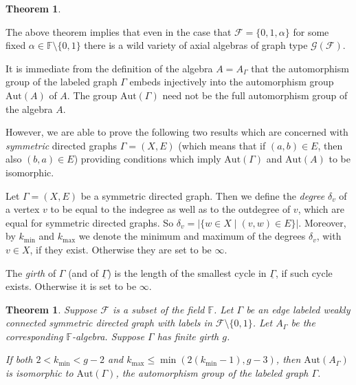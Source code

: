 \documentclass[oneside,a4paper]{amsart} %
\newtheorem{theorem}[proposition]{Theorem}
\theoremstyle{definition}
\begin{document}
\begin{theorem}
\begin{table}[h]
\caption{The fusion law of Graph type $\mathcal{G}(\mathcal{F})$, where $\mathcal{F}=\{1,\alpha,\dots,\beta,(0)\}$.
The element $0$ is between brackets as it may not be an eigenvalue. This is the case when any two vertices are adjacent.}\label{fusionlaw}
\end{table}
\end{theorem}

The above theorem implies that even in the case that $\mathcal{F}=\{0,1,\alpha\}$ for some fixed $\alpha\in \mathbb{F}\setminus \{0,1\}$
there is a wild variety of axial algebras of graph type $\mathcal{G}(\mathcal{F})$. 

It is immediate from the definition of the algebra $A=A_{\Gamma}$ that the automorphism group
of the labeled graph $\Gamma$ embeds injectively into the automorphism group $\mathrm{Aut}(A)$ of $A$.
The group $\mathrm{Aut}(\Gamma)$ need not be the full automorphism group of the algebra $A$.

However, we are able to prove the following two results which are concerned with \emph{symmetric} directed graphs $\Gamma=(X,E)$ (which
means that if $(a,b)\in E$, then also $(b,a)\in E$) providing conditions which imply $\mathrm{Aut}(\Gamma)$ and $\mathrm{Aut}(A)$ to be isomorphic.

Let $\Gamma=(X,E)$ be a symmetric directed graph.
Then we define the \emph{degree} $\delta_v$ of a vertex $v$ to be equal to the indegree as well as to the outdegree of $v$, which are equal for symmetric directed graphs.
So $\delta_v=|\{w\in X\mid (v,w) \in E\}|$.
Moreover, by $k_{\mathrm{min}}$ and $k_{\mathrm{max}}$ we denote the minimum and maximum of the degrees $\delta_v$, with $v\in X$, if they exist.
Otherwise they are set to be $\infty$.

The \emph{girth} of $\Gamma$ (and of $\underline{\Gamma}$) is the length of the smallest cycle in $\underline{\Gamma}$, if such cycle exists. Otherwise it is set to be $\infty$.

\begin{theorem}\label{graphthm}
Suppose $\mathcal{F}$ is a subset of  the field $\mathbb{F}$.
Let $\Gamma$ be an edge labeled weakly connected symmetric directed  graph with labels in $\mathcal{F}\setminus \{0,1\}$.
Let $A_\Gamma$ be the corresponding $\mathbb{F}$-algebra.
Suppose $\Gamma$ has finite girth $g$.

If both  $2<k_\mathrm{min}<g-2$ and   $k_\mathrm{max}\leq \min(2(k_{\mathrm{min}}-1),g-3)$,
then $\mathrm{Aut}(A_{\Gamma})$ is isomorphic to  $\mathrm{Aut}(\Gamma)$, the automorphism group of the labeled graph $\Gamma$.
\end{theorem}
\end{document}
